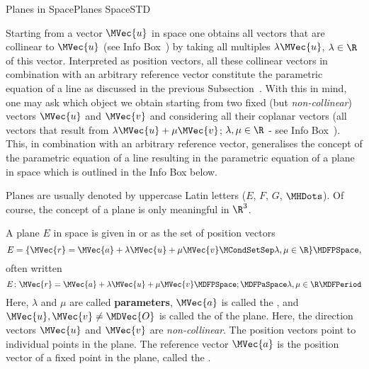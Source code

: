 \begin{MXContent}{Planes in Space}{Planes Space}{STD}


Starting from a vector $\MVec{u}$ in space one obtains all vectors that are collinear to $\MVec{u}$ 
(see Info Box~) by taking all multiples $\lambda\MVec{u}$, $\lambda\in\R$
of this vector. Interpreted as position vectors, all these collinear vectors in combination with an arbitrary 
reference vector constitute the parametric equation of a line as discussed in the previous Subsection~.
With this in mind, one may ask which object we obtain starting from two fixed (but \textit{non-collinear}) 
vectors $\MVec{u}$ and $\MVec{v}$ and considering all their coplanar vectors (all vectors that result from 
$\lambda\MVec{u}+\mu\MVec{v}$; $\lambda,\mu\in\R$ - see Info Box~). 
This, in combination with an arbitrary reference vector, generalises the concept of the parametric equation of a line resulting 
in the parametric equation of a plane in space which is outlined in the Info Box below. 

Planes are usually denoted by uppercase Latin letters ($E$, $F$, $G$, $\MHDots$). Of course, the concept of a plane 
is only meaningful in $\R^3$.

\begin{MInfo}
A plane $E$ in space is given in  or  
 as the set of position vectors
\[
 E=\{\MVec{r}=\MVec{a}+\lambda\MVec{u}+\mu\MVec{v}\MCondSetSep \lambda,\mu\in\R\} \MDFPSpace ,
\]
often written
\[
 E\colon\MVec{r}=\MVec{a}+\lambda\MVec{u}+\mu\MVec{v}\MDFPSpace;\MDFPaSpace \lambda,\mu\in\R \MDFPeriod
\]
Here, $\lambda$ and $\mu$ are called \textbf{parameters}, $\MVec{a}$ is called the 
, and $\MVec{u},\MVec{v}\neq\MDVec{O}$ is called 
the  of the plane. Here, the direction vectors 
$\MVec{u}$ and $\MVec{v}$ are \textit{non-collinear}. The position vectors point to individual 
points in the plane. The reference vector $\MVec{a}$ is the position vector of a fixed point in the plane, called the .


\end{MInfo}
\end{MXContent}

